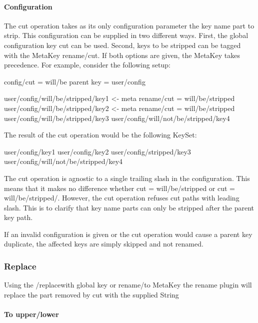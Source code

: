 \paragraph*{Configuration}

The cut operation takes as its only configuration parameter the key name part to strip. This configuration can be supplied in two different ways. First, the global configuration key {\ttfamily cut} can be used. Second, keys to be stripped can be tagged with the Meta\+Key {\ttfamily rename/cut}. If both options are given, the Meta\+Key takes precedence. For example, consider the following setup\+:


\begin{DoxyCode}
config/cut = will/be
parent key = user/config

user/config/will/be/stripped/key1               <- meta rename/cut = will/be/stripped
user/config/will/be/stripped/key2               <- meta rename/cut = will/be/stripped
user/config/will/be/stripped/key3
user/config/will/not/be/stripped/key4
\end{DoxyCode}


The result of the cut operation would be the following Key\+Set\+:


\begin{DoxyCode}
user/config/key1
user/config/key2
user/config/stripped/key3
user/config/will/not/be/stripped/key4
\end{DoxyCode}


The cut operation is agnostic to a single trailing slash in the configuration. This means that it makes no difference whether {\ttfamily cut = will/be/stripped} or {\ttfamily cut = will/be/stripped/}. However, the cut operation refuses cut paths with leading slash. This is to clarify that key name parts can only be stripped after the parent key path.

If an invalid configuration is given or the cut operation would cause a parent key duplicate, the affected keys are simply skipped and not renamed.

\subsubsection*{Replace}

Using the {\ttfamily /replacewith} global key or {\ttfamily rename/to} Meta\+Key the rename plugin will replace the part removed by {\ttfamily cut} with the supplied String

\paragraph*{To upper/lower}


